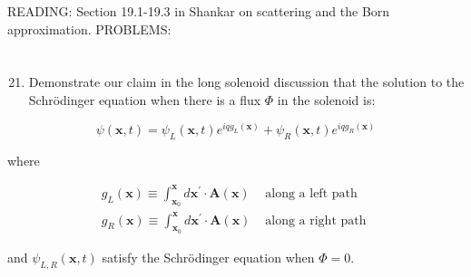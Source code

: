 \documentclass[12pt]{article}
\begin{document}
READING: Section 19.1-19.3 in Shankar on scattering and the Born approximation. PROBLEMS:
\section{}
\begin{enumerate}
  \setcounter{enumi}{20}
  \item Demonstrate our claim in the long solenoid discussion that the solution to the Schrödinger equation when there is a flux $\Phi$ in the solenoid is:
\end{enumerate}

$$
\psi(\mathbf{x}, t)=\psi_{L}(\mathbf{x}, t) e^{i q g_{L}(\mathbf{x})}+\psi_{R}(\mathbf{x}, t) e^{i q g_{R}(\mathbf{x})}
$$

where

$$
\begin{array}{ll}
g_{L}(\mathbf{x}) \equiv \int_{\mathbf{x}_{0}}^{\mathbf{x}} d \mathbf{x}^{\prime} \cdot \mathbf{A}(\mathbf{x}) & \text { along a left path } \\
g_{R}(\mathbf{x}) \equiv \int_{\mathbf{x}_{0}}^{\mathbf{x}} d \mathbf{x}^{\prime} \cdot \mathbf{A}(\mathbf{x}) & \text { along a right path }
\end{array}
$$

and $\psi_{L, R}(\mathbf{x}, t)$ satisfy the Schrödinger equation when $\Phi=0$.
\end{document}
